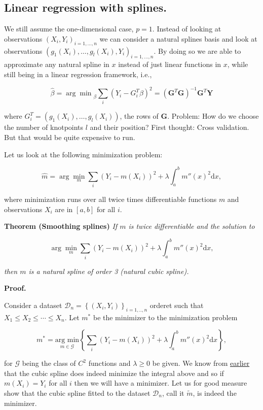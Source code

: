 \documentclass[a4paper,10pt,openany]{book}
\begin{document}
\hypertarget{linear-regression-with-splines.}{%
\subsection{Linear regression with splines.}\label{linear-regression-with-splines.}}

We still assume the one-dimensional case, \(p=1\). Instead of looking at observations \((X_i,Y_i)_{i=1,\dots,n}\) we can consider a natural splines basis and look at observations \((g_1(X_i), \dots, g_l(X_i), Y_i)_{i=1,\dots,n}.\) By doing so we are able to approximate any natural spline in \(x\) instead of just linear functions in \(x\), while still being in a linear regression framework, i.e.,

\[
\hat \beta = {\arg \min }_\beta \sum_i (Y_i - { G_i^T}\beta )^2= (\mathbf G^T\mathbf  G)^{-1}\mathbf  G^T\mathbf Y
\]

where \(G_i^T=(g_1(X_i), \dots, g_l(X_i))\), the rows of \(\mathbf G\). Problem: How do we choose the number of knotpoints \(l\) and their position? First thought: Cross validation. But that would be quite expensive to run.

Let us look at the following minimization problem:

\[
\hat m= \arg\min_{m} \sum_i (Y_i-m(X_i))^2+\lambda\int_a^b m''(x)^2\mathrm dx,
\]

where minimization runs over all twice times differentiable functions \(m\) and observations \(X_i\) are in \([a,b]\) for all \(i\).

\textbf{Theorem (Smoothing splines)} \emph{If \(m\) is twice differentiable and the solution to }

\[
\arg\min_{m} \sum_i (Y_i-m(X_i))^2+\lambda\int_a^b m''(x)^2\mathrm dx,
\]

\emph{then \(m\) is a natural spline of order 3 (natural cubic spline).}

\textbf{Proof.}

Consider a dataset \(\mathcal D_n=\left\{(X_i,Y_i)\right\}_{i=1,..,n}\) orderet such that \(X_1\le X_2\le \cdots \le X_n\). Let \(m^*\) be the minimizer to the minimization problem

\[
m^*=\underset{m\in\mathcal G}{\text{arg min}}\left\{\sum_i (Y_i-m(X_i))^2+\lambda\int_a^b m''(x)^2\mathrm dx\right\},
\]

for \(\mathcal G\) being the class of \(C^2\) functions and \(\lambda\ge 0\) be given. We know from \href{https://random-walks.org/content/misc/ncs/ncs.html}{earlier} that the cubic spline does indeed minimize the integral above and so if \(m(X_i)=Y_i\) for all \(i\) then we will have a minimizer. Let us for good measure show that the cubic spline fitted to the dataset \(\mathcal D_n\), call it \(\tilde m\), is indeed the minimizer.
\end{document}
